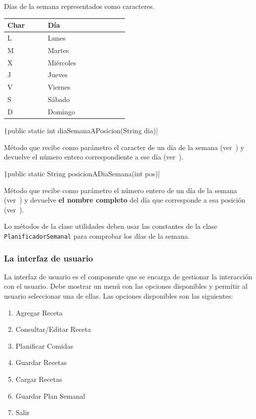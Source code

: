 \documentclass[
    a4paper, %
    12pt, %
]{CSSullivanBusinessReport}
\begin{document}
\begin{margintable}
    \footnotesize
    \caption{Días de la semana representados como caracteres.}\label{tab:char-semana}
    \begin{tabular}{C{0.2\linewidth} L{0.4\linewidth}}
        \toprule
        \textbf{Char} & \textbf{Día}\\
        \midrule
        L & Lunes\\
        M & Martes\\
        X & Miércoles\\
        J & Jueves\\
        V & Viernes\\
        S & Sábado\\
        D & Domingo\\
        \bottomrule
    \end{tabular}
\end{margintable}

\texttt|public static int diaSemanaAPosicion(String dia)|

Método que recibe como parámetro el caracter de un día de la semana (ver~) y devuelve el número entero correspondiente a ese día (ver~).

\texttt|public static String posicionADiaSemana(int pos)|

Método que recibe como parámetro el número entero de un día de la semana (ver~) y devuelve \textbf{el nombre completo} del día que corresponde a esa posición (ver~).

Lo métodos de la clase utilidades deben usar las constantes de la clase \texttt{PlanificadorSemanal} para comprobar los días de la semana.




\subsubsection{La interfaz de usuario}\label{sec:interfaz-usuario}
La interfaz de usuario es el componente que se encarga de gestionar la interacción con el usuario. Debe mostrar un menú con las opciones disponibles y permitir al usuario seleccionar una de ellas. Las opciones disponibles son las siguientes:

\begin{enumerate}
    \item Agregar Receta
    \item Consultar/Editar Receta
    \item Planificar Comidas
    \item Guardar Recetas
    \item Cargar Recetas
    \item Guardar Plan Semanal
    \item Salir
\end{enumerate}
\end{document}

